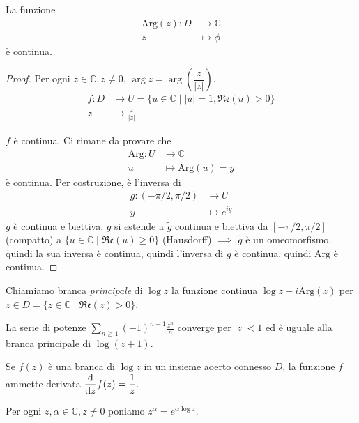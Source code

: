 \begin{prop}
  La funzione
  \begin{align*}
    \text{Arg}(z):D &\longrightarrow \mathbb{C}\\
    z &\longmapsto \phi
  \end{align*}
  è continua.
\end{prop}

\begin{proof}
  Per ogni $z \in \mathbb{C}, z \not=0$, $\arg{z}=\arg{\left(\dfrac{z}{|z|}\right)}$.
  \begin{align*}
    f:D &\longrightarrow U=\{u \in \mathbb{C} \mid |u|=1, \mathfrak{Re}(u)>0\}\\
    z &\longmapsto \frac{z}{|z|}
  \end{align*}
  \begin{center}
  \end{center}
  $f$ è continua. Ci rimane da provare che
  \begin{align*}
    \text{Arg}:U &\longrightarrow \mathbb{C}\\
    u &\longmapsto \text{Arg}(u)=y
  \end{align*}
  è continua.
  Per costruzione, è l'inversa di
  \begin{align*}
    g:(-\pi/2, \pi/2) &\longrightarrow U\\
    y &\longmapsto e^{iy}
  \end{align*}
  $g$ è continua e biettiva. $g$ si estende a $\tilde{g}$ continua e biettiva da $[-\pi/2, \pi/2]$ (compatto) a $\{u \in \mathbb{C} \mid \mathfrak{Re}(u) \ge 0\}$ (Hausdorff) $\implies$ $\tilde{g}$ è un omeomorfismo, quindi la sua inversa è continua, quindi l'inversa di $g$ è continua, quindi $\text{Arg}$ è continua.
\end{proof}

\begin{defn}
  Chiamiamo branca \textit{principale} di $\log{z}$ la funzione continua $\log{z}+i\text{Arg}(z)$ per $z \in D=\{z \in \mathbb{C} \mid \mathfrak{Re}(z)>0\}$.
\end{defn}

\begin{prop}
  La serie di potenze $\displaystyle \sum_{n \ge 1} (-1)^{n-1}\frac{z^n}{n}$ converge per $|z|<1$ ed è uguale alla branca principale di $\log{(z+1)}$.
\end{prop}

\begin{prop}
  Se $f(z)$ è una branca di $\log{z}$ in un insieme aoerto connesso $D$, la funzione $f$ ammette derivata $\dfrac{\mathop{}\!\mathrm{d}}{\mathop{}\!\mathrm{d} z}f(z)=\dfrac{1}{z}$.
\end{prop}

\begin{defn}
  Per ogni $z, \alpha \in \mathbb{C}, z \not=0$ poniamo $z^{\alpha}=e^{\alpha\log{z}}$.
\end{defn}
